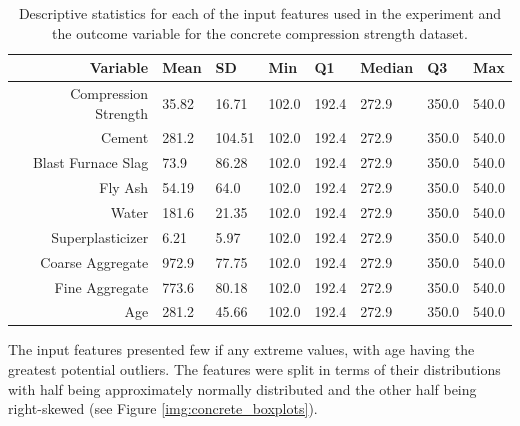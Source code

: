 \documentclass[10pt]{article}\usepackage[]{graphicx}\usepackage[]{xcolor}
\begin{document}
\begin{table}[h!]
  \begin{center}
    \begin{tabular}{r|l|l|l|l|l|l|l}
    \textbf{Variable} & \textbf{Mean} & \textbf{SD} & \textbf{Min} & \textbf{Q1} & \textbf{Median} & \textbf{Q3} & \textbf{Max} \\
      \hline
   Compression Strength & 35.82 & 16.71 & 102.0 & 192.4 & 272.9 & 350.0 & 540.0  \\
   Cement & 281.2 & 104.51 & 102.0 & 192.4 & 272.9 & 350.0 & 540.0 \\
   Blast Furnace Slag & 73.9 & 86.28 & 102.0 & 192.4 & 272.9 & 350.0 & 540.0 \\
   Fly Ash & 54.19 & 64.0 & 102.0 & 192.4 & 272.9 & 350.0 & 540.0 \\
   Water & 181.6 & 21.35 & 102.0 & 192.4 & 272.9 & 350.0 & 540.0 \\
   Superplasticizer & 6.21 & 5.97 & 102.0 & 192.4 & 272.9 & 350.0 & 540.0 \\
   Coarse Aggregate & 972.9 & 77.75 & 102.0 & 192.4 & 272.9 & 350.0 & 540.0 \\
   Fine Aggregate & 773.6 & 80.18 & 102.0 & 192.4 & 272.9 & 350.0 & 540.0 \\
   Age & 281.2 & 45.66 & 102.0 & 192.4 & 272.9 & 350.0 & 540.0 \\
    \end{tabular}
    \caption{Descriptive statistics for each of the input features used in the experiment and the outcome variable for the concrete compression strength dataset.}
    \label{tab:concrete_stats}
  \end{center}
\end{table}

The input features presented few if any extreme values, with age having the greatest potential outliers. The features were split in terms of their distributions with half being approximately normally distributed and the other half being right-skewed (see Figure \ref{img:concrete_boxplots}).
\end{document}
